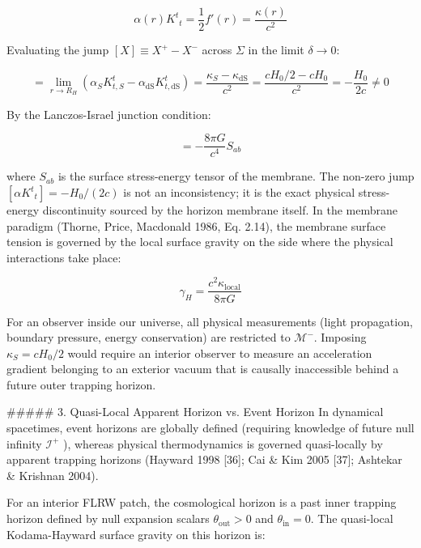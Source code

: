 \documentclass[11pt,a4paper]{article}
\theoremstyle{definition}
\theoremstyle{remark}
\begin{document}
\begin{equation}
\alpha(r) K^t{}_t = \frac{1}{2} f'(r) = \frac{\kappa(r)}{c^2}
\end{equation}


Evaluating the jump $[X] \equiv X^+ - X^-$ across $\Sigma$ in the limit $\delta \to 0$:


\begin{equation}
[\alpha K^t{}_t] = \lim_{r \to R_H} \left( \alpha_S K^t_{t,S} - \alpha_{\text{dS}} K^t_{t,\text{dS}} \right) = \frac{\kappa_S - \kappa_{\text{dS}}}{c^2} = \frac{c H_0 / 2 - c H_0}{c^2} = -\frac{H_0}{2 c} \neq 0
\end{equation}


By the Lanczos-Israel junction condition:


\begin{equation}
[K_{ab} - K h_{ab}] = -\frac{8\pi G}{c^4} S_{ab}
\end{equation}


where $S_{ab}$ is the surface stress-energy tensor of the membrane. The non-zero jump $[\alpha K^t{}_t] = -H_0 / (2c)$ is not an inconsistency; it is the exact physical stress-energy discontinuity sourced by the horizon membrane itself. In the membrane paradigm (Thorne, Price, Macdonald 1986, Eq. 2.14), the membrane surface tension is governed by the local surface gravity on the side where the physical interactions take place:


\begin{equation}
\gamma_H = \frac{c^2 \kappa_{\text{local}}}{8\pi G}
\end{equation}


For an observer inside our universe, all physical measurements (light propagation, boundary pressure, energy conservation) are restricted to $\mathcal{M}^-$. Imposing $\kappa_S = c H_0 / 2$ would require an interior observer to measure an acceleration gradient belonging to an exterior vacuum that is causally inaccessible behind a future outer trapping horizon.

\#\#\#\#\# 3. Quasi-Local Apparent Horizon vs. Event Horizon
In dynamical spacetimes, event horizons are globally defined (requiring knowledge of future null infinity $\mathscr{I}^+$ ), whereas physical thermodynamics is governed quasi-locally by apparent trapping horizons (Hayward 1998 [36]; Cai \& Kim 2005 [37]; Ashtekar \& Krishnan 2004).

For an interior FLRW patch, the cosmological horizon is a past inner trapping horizon defined by null expansion scalars $\theta_{\text{out}} > 0$ and $\theta_{\text{in}} = 0$. The quasi-local Kodama-Hayward surface gravity on this horizon is:
\end{document}

